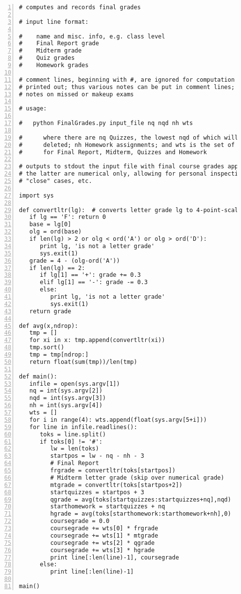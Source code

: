 \begin{Verbatim}[fontsize=\relsize{-2},numbers=left]
# computes and records final grades

# input line format:

#    name and misc. info, e.g. class level
#    Final Report grade
#    Midterm grade
#    Quiz grades
#    Homework grades

# comment lines, beginning with #, are ignored for computation but are
# printed out; thus various notes can be put in comment lines; e.g.
# notes on missed or makeup exams 

# usage:  

#   python FinalGrades.py input_file nq nqd nh wts 

#      where there are nq Quizzes, the lowest nqd of which will be
#      deleted; nh Homework assignments; and wts is the set of weights
#      for Final Report, Midterm, Quizzes and Homework

# outputs to stdout the input file with final course grades appended;
# the latter are numerical only, allowing for personal inspection of
# "close" cases, etc.

import sys

def convertltr(lg):  # converts letter grade lg to 4-point-scale
   if lg == 'F': return 0
   base = lg[0]
   olg = ord(base)
   if len(lg) > 2 or olg < ord('A') or olg > ord('D'):
      print lg, 'is not a letter grade'
      sys.exit(1)
   grade = 4 - (olg-ord('A'))
   if len(lg) == 2:
      if lg[1] == '+': grade += 0.3
      elif lg[1] == '-': grade -= 0.3
      else:
         print lg, 'is not a letter grade'
         sys.exit(1)
   return grade

def avg(x,ndrop):
   tmp = []
   for xi in x: tmp.append(convertltr(xi)) 
   tmp.sort()
   tmp = tmp[ndrop:]
   return float(sum(tmp))/len(tmp)

def main():
   infile = open(sys.argv[1])
   nq = int(sys.argv[2])
   nqd = int(sys.argv[3])
   nh = int(sys.argv[4])
   wts = []
   for i in range(4): wts.append(float(sys.argv[5+i]))
   for line in infile.readlines():
      toks = line.split()
      if toks[0] != '#':
         lw = len(toks)
         startpos = lw - nq - nh - 3
         # Final Report
         frgrade = convertltr(toks[startpos])
         # Midterm letter grade (skip over numerical grade)
         mtgrade = convertltr(toks[startpos+2])
         startquizzes = startpos + 3
         qgrade = avg(toks[startquizzes:startquizzes+nq],nqd)
         starthomework = startquizzes + nq
         hgrade = avg(toks[starthomework:starthomework+nh],0)
         coursegrade = 0.0
         coursegrade += wts[0] * frgrade
         coursegrade += wts[1] * mtgrade
         coursegrade += wts[2] * qgrade
         coursegrade += wts[3] * hgrade
         print line[:len(line)-1], coursegrade
      else: 
         print line[:len(line)-1] 

main()
\end{Verbatim}

